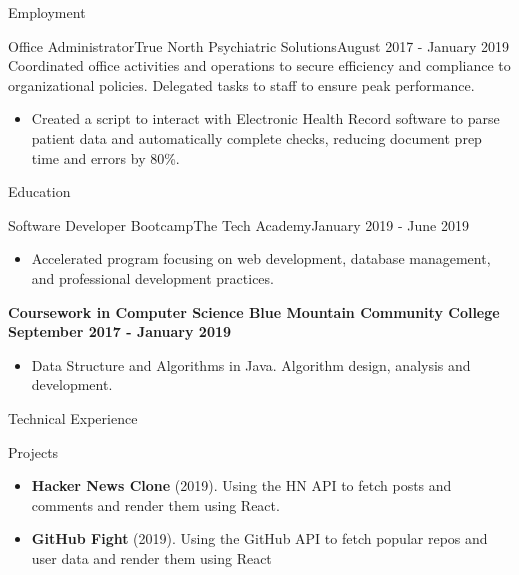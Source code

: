 \documentclass[]{mcdowellcv}
\begin{document}
\begin{cvsection}{Employment}
		\begin{cvsubsection}{Office Administrator}{True North Psychiatric Solutions}{August 2017 - January 2019}		
			Coordinated office activities and operations to secure efficiency and compliance to organizational policies. Delegated tasks to staff to ensure peak performance.
			\begin{itemize}
				\item Created a script to interact with Electronic Health Record software to parse patient data and automatically complete checks, reducing document prep time and errors by 80\%.
			\end{itemize}
		\end{cvsubsection}
	\end{cvsection}
	
	\begin{cvsection}{Education}
		\begin{cvsubsection}{Software Developer Bootcamp}{The Tech Academy}{January 2019 - June 2019}
			\begin{itemize}
				\item Accelerated program focusing on web development, database management, and professional development practices.
			\end{itemize}
		\end{cvsubsection}
		\begin{cvsubsection}{}{}{}
		\textbf{Coursework in Computer Science \hfill Blue Mountain Community College } \hfill \textbf{September 2017 - January 2019}
			\begin{itemize}
				\item Data Structure and Algorithms in Java. Algorithm design, analysis and development.
			\end{itemize}
		\end{cvsubsection}
	\end{cvsection}
	
	\begin{cvsection}{Technical Experience}
		\begin{cvsubsection}{Projects}{}{}
			\begin{itemize}
				\item \textbf{Hacker News Clone} (2019). Using the HN API to fetch posts and comments and render them using React.
				\item \textbf{GitHub Fight} (2019). Using the GitHub API to fetch popular repos and user data and render them using React
			\end{itemize}
		\end{cvsubsection}
	\end{cvsection}
	
\end{document}
